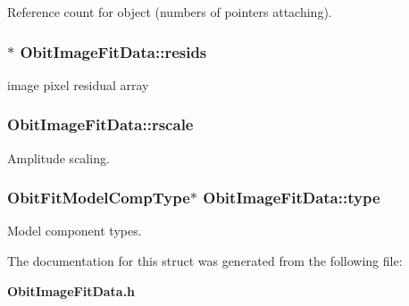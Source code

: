 Reference count for object (numbers of pointers attaching). 

\subsubsection{$\ast$ {\bf Obit\-Image\-Fit\-Data::resids}}\label{structObitImageFitData_o6}


image pixel residual array 

\subsubsection{ {\bf Obit\-Image\-Fit\-Data::rscale}}\label{structObitImageFitData_o21}


Amplitude scaling. 

\subsubsection{\setlength{\rightskip}{0pt plus 5cm}Obit\-Fit\-Model\-Comp\-Type$\ast$ {\bf Obit\-Image\-Fit\-Data::type}}\label{structObitImageFitData_o13}


Model component types. 



The documentation for this struct was generated from the following file:\begin{CompactItemize}
\item 
{\bf Obit\-Image\-Fit\-Data.h}\end{CompactItemize}
